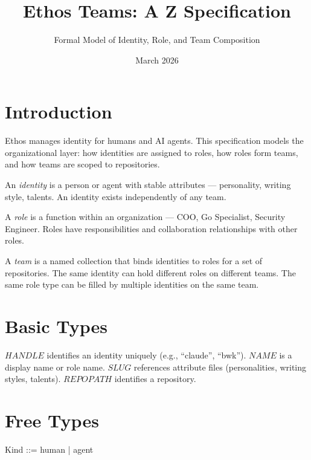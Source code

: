 \documentclass[a4paper,10pt,fleqn]{article}
\begin{document}
\title{Ethos Teams: A Z Specification}
\author{Formal Model of Identity, Role, and Team Composition}
\date{March 2026}
\maketitle

\tableofcontents
\newpage

\section{Introduction}

Ethos manages identity for humans and AI agents. This specification
models the organizational layer: how identities are assigned to roles,
how roles form teams, and how teams are scoped to repositories.

An \emph{identity} is a person or agent with stable attributes ---
personality, writing style, talents. An identity exists independently
of any team.

A \emph{role} is a function within an organization --- COO, Go
Specialist, Security Engineer. Roles have responsibilities and
collaboration relationships with other roles.

A \emph{team} is a named collection that binds identities to roles for
a set of repositories. The same identity can hold different roles on
different teams. The same role type can be filled by multiple
identities on the same team.

\section{Basic Types}

\begin{zed}
\end{zed}

$HANDLE$ identifies an identity uniquely (e.g., ``claude'', ``bwk'').
$NAME$ is a display name or role name. $SLUG$ references attribute
files (personalities, writing styles, talents). $REPOPATH$ identifies
a repository.

\section{Free Types}

\begin{zed}
  Kind ::= human | agent
\end{zed}
\end{document}
